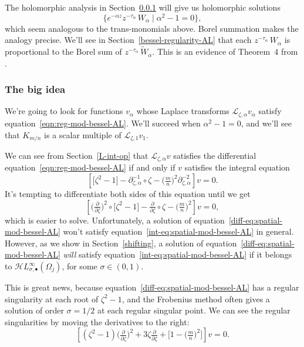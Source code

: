 \documentclass{article}
\newcommand{\singexp}[2]{\mathcal{H}L^\infty_{#1, #2}}
\newcommand{\singexpalg}[1]{\singexp{#1}{\bullet}}
\theoremstyle{definition}
\newcommand{\series}[1]{\tilde{#1}}
\newcommand{\fracderiv}[3]{\partial^{#1}_{#2, #3}}
\newcommand{\laplace}{\mathcal{L}}
\theoremstyle{plain}
\begin{document}
The holomorphic analysis in Section~\ref{big-idea} will give us holomorphic solutions
\[ \{ e^{-\alpha z} z^{-\tau_\alpha}\,W_\alpha \mid \alpha^2 - 1 = 0 \}, \]
which seem analogous to the trans-monomials above. Borel summation makes the analogy precise. We’ll see in Section~\ref{bessel-regularity-AL} that each $z^{-\tau_\alpha}\,W_\alpha$ is proportional to the Borel sum of $z^{-\tau_\alpha}\,\series{W}_\alpha$. This is an evidence of Theorem~4 from \cite{reg-sing-volterra}.
\subsubsection{The big idea}\label{big-idea}
We're going to look for functions $v_\alpha$ whose Laplace transforms $\laplace_{\zeta, \alpha} v_\alpha$ satisfy equation~\eqref{eqn:reg-mod-bessel-AL}. We'll succeed when $\alpha^2 - 1 = 0$, and we'll see that $K_{m/n}$ is a scalar multiple of $\laplace_{\zeta, 1} v_1$.

We can see from Section~\ref{L-int-op} that $\laplace_{\zeta, \alpha} v$ satisfies the differential equation~\eqref{eqn:reg-mod-bessel-AL} if and only if $v$ satisfies the integral equation
\begin{equation}\label{int-eq:spatial-mod-bessel-AL}
\left[ \big[ \zeta^2 - 1 \big] - \fracderiv{-1}{\zeta}{\alpha} \circ \zeta - \big(\tfrac{m}{n}\big)^2 \fracderiv{-2}{\zeta}{\alpha} \right] v = 0.
\end{equation}
It's tempting to differentiate both sides of this equation until we get
\begin{equation}\label{diff-eq:spatial-mod-bessel-AL}
\left[ \big(\tfrac{\partial}{\partial \zeta}\big)^2 \circ \big[ \zeta^2 - 1 \big] - \tfrac{\partial}{\partial \zeta} \circ \zeta - \big(\tfrac{m}{n}\big)^2 \right] v = 0,
\end{equation}
which is easier to solve. Unfortunately, a solution of equation~\eqref{diff-eq:spatial-mod-bessel-AL} won't satisfy equation~\eqref{int-eq:spatial-mod-bessel-AL} in general. However, as we show in Section~\ref{shifting}, a solution of equation~\eqref{diff-eq:spatial-mod-bessel-AL} {\em will} satisfy equation~\eqref{int-eq:spatial-mod-bessel-AL} if it belongs to $\singexpalg{\sigma}(\Omega_j)$, for some $\sigma\in (0,1)$.

This is great news, because equation~\eqref{diff-eq:spatial-mod-bessel-AL} has a regular singularity at each root of $\zeta^2 - 1$, and the Frobenius method often gives a solution of order $\sigma=1/2$ at each regular singular point. We can see the regular singularities by moving the derivatives to the right:
\[ \left[ (\zeta^2 - 1) \big(\tfrac{\partial}{\partial \zeta}\big)^2 + 3\zeta \tfrac{\partial}{\partial \zeta} + \big[ 1 - \big(\tfrac{m}{n}\big)^2 \big] \right] v = 0. \]
\end{document}
